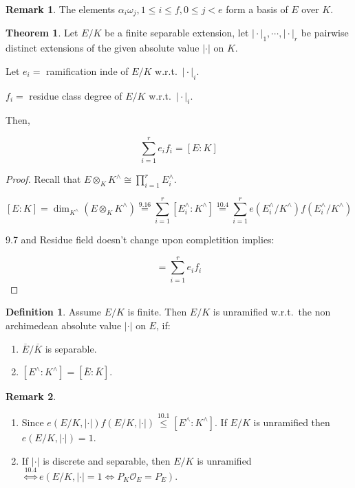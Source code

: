 \documentclass[openany]{amsbook}
\numberwithin{section}{chapter}
\theoremstyle{definition}
\newtheorem*{definition}{Definition}
\newtheorem*{remark}{Remark}
\newtheorem{theorem}{Theorem}[chapter]
\begin{document}
\begin{remark}
    The elements \(\alpha_i \omega_j, 1 \leq i \leq f, 0 \leq j < e\) form a basis of \(E\) over \(K\).
\end{remark}

\begin{theorem}
    Let \(E / K\) be a finite separable extension, let \(\vert \cdot \vert_1 ,\cdots , \vert \cdot \vert_r\) be pairwise distinct extensions of the given absolute value \(\vert \cdot \vert\) on \(K\).

    Let \(e_i =\) ramification inde of \(E / K\) w.r.t.\ \(\vert \cdot  \vert _i\).
    
    \(f_i =\) residue class degree of \(E / K\) w.r.t.\ \(\vert \cdot \vert _i\).

    Then,

    \[
        \sum_{i=1}^r e_i f_i = [E:K]
    \]
\end{theorem}

\begin{proof}
    Recall that \(E \otimes_K K^\wedge \cong \prod_{i=1}^r E_i^\wedge\).

    \[
        [E:K] = \dim_{K^\wedge} (E \otimes_K K^\wedge) \overset{9.16}{=} \sum_{i=1}^r [E_i^\wedge : K^\wedge] \overset{10.4}{=} \sum_{i=1}^r e(E_i^\wedge / K^\wedge) f(E_i^\wedge / K^\wedge)
    \]

    9.7 and Residue field doesn't change upon completition implies:

    \[
        = \sum_{i=1}^r e_i f_i 
    \]
\end{proof}

\begin{definition}
    Assume \(E / K\) is finite. Then \(E / K\) is unramified w.r.t.\ the non archimedean absolute value \(\vert \cdot \vert \) on \(E\), if:

    \begin{enumerate}[label=\roman*)]
        \item \(\overline{E} / \overline{K}\) is separable.
        \item \([E^\wedge : K^\wedge] = [\overline{E} : \overline{K}]\). 
    \end{enumerate} 
\end{definition}

\begin{remark}
    \begin{enumerate}[label=\arabic*)]
        \item Since \(e(E / K, \vert \cdot \vert) f(E / K, \vert \cdot \vert) \overset{10.1}{\leq} [E^\wedge : K^\wedge]\). If \(E / K\) is unramified then \(e(E / K, \vert \cdot \vert) = 1\).
        \item If \(\vert \cdot \vert\) is discrete and separable, then \(E / K\) is unramified \(\overset{10.4}{\iff} e(E / K, \vert \cdot \vert = 1 \iff P_K \mathcal{O}_E = P_E)\). 
    \end{enumerate} 
\end{remark}
\end{document}
